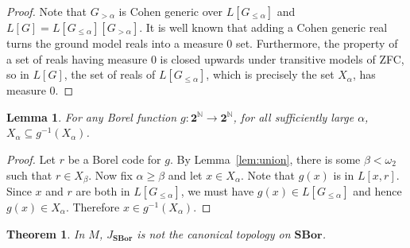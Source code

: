 \documentclass[11pt]{amsart}
\newcommand\I{^{-1}}
\newcommand{\N}{\mathbb{N}}
\newcommand\SBor{\mathbf{SBor}}
\newcommand\two{\mathbf{2}}
\newcommand\Cantor{\two^\N}
\theoremstyle{definition}
\theoremstyle{remark}
\theoremstyle{plain}
\newtheorem{thm}[defn]{Theorem}
\newtheorem{lem}[defn]{Lemma}
\begin{document}
\begin{proof}
Note that $G_{> \alpha}$ is Cohen generic over $L[G_{\leq \alpha}]$ and $L[G] = L[G_{\leq \alpha}][G_{> \alpha}]$. It is well known that adding a Cohen generic real turns the ground model reals into a measure $0$ set. Furthermore, the property of a set of reals having measure $0$ is closed upwards under transitive models of ZFC, so in $L[G]$, the set of reals of $L[G_{\leq \alpha}]$, which is precisely the set $X_\alpha$, has measure $0$.
\end{proof}

\begin{lem}
\label{lem:subsetpreimage}
For any Borel function $g\colon \Cantor \to \Cantor$, for all sufficiently large $\alpha$, $X_\alpha \subseteq g\I(X_\alpha)$.
\end{lem}

\begin{proof}
Let $r$ be a Borel code for $g$. By Lemma~\ref{lem:union}, there is some $\beta < \omega_2$ such that $r \in X_\beta$. Now fix $\alpha \geq \beta$ and let $x \in X_\alpha$. Note that $g(x)$ is in $L[x, r]$. Since $x$ and $r$ are both in $L[G_{\leq \alpha}]$, we must have $g(x) \in L[G_{\leq \alpha}]$ and hence $g(x) \in X_\alpha$. Therefore $x \in g\I(X_\alpha)$.
\end{proof}

\begin{thm}
In $M$, $J_\SBor$ is not the canonical topology on $\SBor$.
\end{thm}
\end{document}
